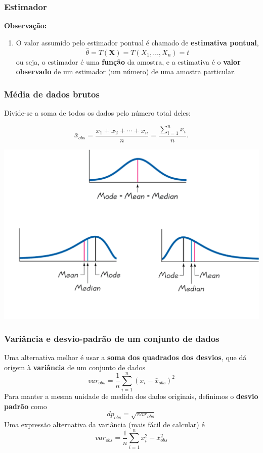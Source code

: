 \documentclass[11pt]{beamer}
\begin{document}
\begin{frame}
\frametitle{Estimador}

\textbf{Observação:}

\begin{enumerate}
\def\labelenumi{\arabic{enumi}.}

\item
  O valor assumido pelo estimador pontual é chamado de
  \textbf{estimativa
  pontual},\[\hat{\theta} = T(\mathbf{X}) = T(X_1, \ldots, X_n) = t\] ou
  seja, o estimador é uma \textbf{função} da amostra, e a estimativa é o
  \textbf{valor observado} de um estimador (um número) de uma amostra
  particular.
\end{enumerate}
\end{frame}

\begin{frame}
\frametitle{Média de dados brutos}

Divide-se a soma de todos os dados pelo número total deles:

\[
\bar{x}_{obs} = \frac{x_1 + x_2 + \cdots + x_n}{n} = \frac{\sum_{i=1}^n
x_i}{n}.
\]
\begin{center}\includegraphics[width=0.8\linewidth]{figs/medidas-crop} \end{center}
\end{frame}

\begin{frame}
\frametitle{Variância e desvio-padrão de um conjunto de dados}

Uma alternativa melhor é usar a \textbf{soma dos quadrados dos desvios},
que dá origem à \textbf{variância} de um conjunto de dados \[
var_{obs} = \frac{1}{n}\sum_{i=1}^n (x_i - \bar{x}_{obs})^2
\] Para manter a mesma unidade de medida dos dados originais, definimos
o \textbf{desvio padrão} como \[
dp_{obs} = \sqrt{var_{obs}}
\] Uma expressão alternativa da variância (mais fácil de calcular) é \[
var_{obs} = \frac{1}{n}\sum_{i=1}^n x_i^2 - \bar{x}_{obs}^2
\]
\end{frame}
\end{document}
